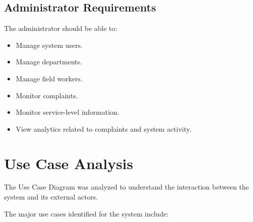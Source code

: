 \documentclass[12pt,a4paper]{article}
\begin{document}
\subsection{Administrator Requirements}

The administrator should be able to:

\begin{itemize}[leftmargin=*]

\item Manage system users.

\item Manage departments.

\item Manage field workers.

\item Monitor complaints.

\item Monitor service-level information.

\item View analytics related to complaints and system activity.

\end{itemize}


\section{Use Case Analysis}

The Use Case Diagram was analyzed to understand the interaction between the system and its external actors.

The major use cases identified for the system include:
\end{document}
